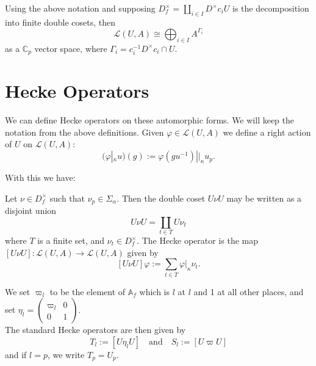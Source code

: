 \begin{lemma}
  Using the above notation and supposing $D_f^\times = \coprod_{i \in I} D^\times c_i U$
  is the decomposition into finite double cosets, then
  \[
    \mathcal{L}(U,A) \cong \bigoplus_{i \in I} A^{\Gamma_i}
  \]
  as a $\mathbb{C}_p$ vector space, where $\Gamma_i = c_i^{-1} D^\times c_i \cap U$.
\end{lemma}

\section{Hecke Operators}

We can define Hecke operators on these automorphic forms. We will keep the notation from the above
definitions.
Given $\varphi \in \mathcal{L}(U,A)$ we define a right action of $U$ on $\mathcal{L}(U,A)$:
\[
  (\varphi |_\kappa u) (g) := \varphi (gu^{-1}) ||_\kappa u_p.
\]

With this we have:
\begin{definition}
  Let $\nu \in D^\times_f$ such that $\nu_p \in \Sigma_\alpha$. Then the double coset $U\nu U$ may
  be written as a disjoint union
  \[
    U \nu U = \coprod_{t \in T} U \nu_t
  \]
  where $T$ is a finite set, and $\nu_t \in D_f^\times$. The Hecke operator is the map
  $[U \nu U] : \mathcal{L}(U,A) \to \mathcal{L}(U,A)$ given by
  \[
    [U \nu U] \varphi := \sum_{t \in T} \varphi |_\kappa \nu_t.
  \]
\end{definition}

\begin{definition}
  We set $\varpi_l$ to be the element of $\mathbb{A}_f$ which is $l$ at  $l$ and 1 at all other
  places, and set $\eta_l = \begin{pmatrix} \varpi_l & 0 \\ 0 &1 \end{pmatrix}$.\\
  The standard Hecke operators are then given by
  \[
    T_l := [U \eta_l U] \quad \text{and} \quad S_l:=[U \varpi U]
  \]
  and if $l = p$, we write $T_p = U_p$.
\end{definition}
